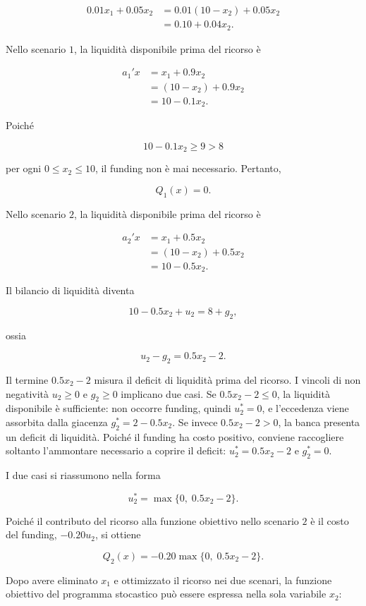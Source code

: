 \begin{enumerate}
\[
\begin{aligned}
0.01x_1+0.05x_2
&=
0.01(10-x_2)+0.05x_2
\\
&=
0.10+0.04x_2.
\end{aligned}
\]

Nello scenario $1$, la liquidit\`a
disponibile prima del ricorso \`e

\[
\begin{aligned}
a_1'x
&=
x_1+0.9x_2
\\
&=
(10-x_2)+0.9x_2
\\
&=
10-0.1x_2.
\end{aligned}
\]

Poich\'e

\[
10-0.1x_2\geq9>8
\]

per ogni $0\leq x_2\leq10$,
il funding non \`e mai necessario.
Pertanto,

\[
Q_1(x)=0.
\]

Nello scenario $2$, la liquidit\`a
disponibile prima del ricorso \`e

\[
\begin{aligned}
a_2'x
&=
x_1+0.5x_2
\\
&=
(10-x_2)+0.5x_2
\\
&=
10-0.5x_2.
\end{aligned}
\]

Il bilancio di liquidit\`a diventa

\[
10-0.5x_2+u_2
=
8+g_2,
\]

ossia

\[
u_2-g_2
=
0.5x_2-2.
\]

Il termine $0.5x_2-2$ misura il deficit
di liquidit\`a prima del ricorso. I vincoli
di non negativit\`a $u_2\geq0$ e $g_2\geq0$
implicano due casi. Se $0.5x_2-2\leq0$,
la liquidit\`a disponibile \`e sufficiente:
non occorre funding, quindi $u_2^*=0$,
e l'eccedenza viene assorbita dalla giacenza
$g_2^*=2-0.5x_2$. Se invece
$0.5x_2-2>0$, la banca presenta
un deficit di liquidit\`a. Poich\'e
il funding ha costo positivo, conviene
raccogliere soltanto l'ammontare necessario
a coprire il deficit: $u_2^*=0.5x_2-2$
e $g_2^*=0$.

I due casi si riassumono nella forma

\[
u_2^*
=
\max\{0,\;0.5x_2-2\}.
\]

Poich\'e il contributo del ricorso alla funzione obiettivo nello scenario $2$ \`e il costo del funding,  
$-0.20u_2$, si ottiene

\[
Q_2(x)
=
-0.20\max\{0,\;0.5x_2-2\}.
\]

Dopo avere eliminato $x_1$
e ottimizzato il ricorso nei due scenari,
la funzione obiettivo del programma stocastico
pu\`o essere espressa nella sola variabile $x_2$:


\end{enumerate}
